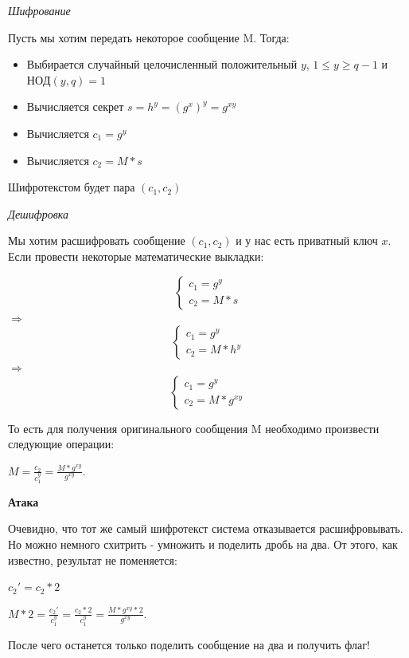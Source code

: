 \documentclass[idxtotoc,hyperref,openany,oneside]{files/crypto} %
\begin{document}
\textit{Шифрование}

Пусть мы хотим передать некоторое сообщение M. Тогда:
\begin{itemize}
	\item Выбирается случайный целочисленный положительный $y$, $1 \leq y \geq q - 1$ и $НОД(y, q) = 1$
	\item Вычисляется секрет $s = h^y = (g^x)^y = g^{xy}$
	\item Вычисляется $c_1 = g^y$
	\item Вычисляется $c_2 = M * s$
\end{itemize}
Шифротекстом будет пара $(c_1, c_2)$

\textit{Дешифровка}

Мы хотим расшифровать сообщение $(c_1, c_2)$ и у нас есть приватный ключ $x$. Если провести некоторые математические выкладки:
\begin{center}
\begin{equation*}
 \begin{cases}
   c_1 = g^y 
   \\
   c_2 = M * s
 \end{cases}
\end{equation*}
$\Rightarrow$
\begin{equation*}
 \begin{cases}
   c_1 = g^y 
   \\
   c_2 = M * h^y
 \end{cases}
\end{equation*}
$\Rightarrow$
\begin{equation*}
 \begin{cases}
   c_1 = g^y 
   \\
   c_2 = M * g^{xy}
 \end{cases}
\end{equation*}
\end{center}
То есть для получения оригинального сообщения M необходимо произвести следующие операции:
\begin{center}
$M = \frac{c_2}{c_1^y} = \frac{M * g^{xy}}{g^{xy}}$.
\end{center}

\textbf{Атака}

Очевидно, что тот же самый шифротекст система отказывается расшифровывать. Но можно немного схитрить - умножить и поделить дробь на два. От этого, как известно, результат не поменяется:
\begin{center}
$c_2' = c_2 * 2$

$M * 2 = \frac{c_2'}{c_1^y} = \frac{c_2 * 2}{c_1^y} = \frac{M * g^{xy} * 2}{g^{xy}}$.
\end{center}
После чего останется только поделить сообщение на два и получить флаг!
\end{document}
